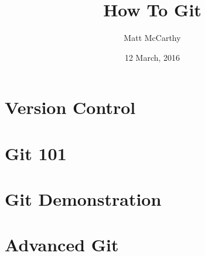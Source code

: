 \documentclass[notitlepage]{simple}
\author{Matt McCarthy}
\title{How To Git}
\date{12 March, 2016}
\begin{document}
\maketitle

\section{Version Control}

\section{Git 101}

\section{Git Demonstration}

\section{Advanced Git}
\end{document}
